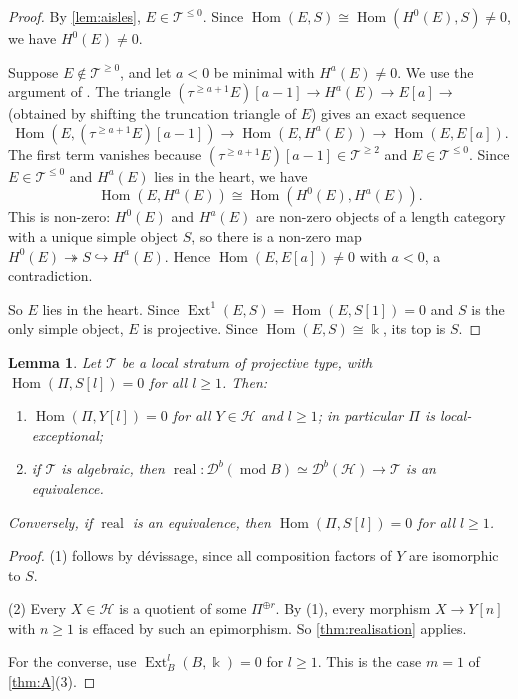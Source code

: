 \documentclass[11pt,reqno]{amsart}
\theoremstyle{plain}
\newtheorem{lemma}[theorem]{Lemma}
\theoremstyle{definition}
\theoremstyle{remark}
\newcommand{\kk}{\Bbbk}
\DeclareMathOperator{\Hom}{Hom}
\DeclareMathOperator{\Ext}{Ext}
\DeclareMathOperator{\real}{real}
\newcommand{\modd}{\operatorname{mod}}
\newcommand{\Db}{\mathcal{D}^b}
\newcommand{\cH}{\mathcal{H}}
\newcommand{\cT}{\mathcal{T}}
\begin{document}
\begin{proof}
By \cref{lem:aisles}, $E\in\cT^{\le0}$. Since $\Hom(E,S)\cong\Hom(H^0(E),S)\neq0$, we have $H^0(E)\ne0$.

Suppose $E\notin\cT^{\ge0}$, and let $a<0$ be minimal with $H^a(E)\ne0$. We use the argument of \cite[Lemma~3.12]{Bonf26}. The triangle $(\tau^{\ge a+1}E)[a-1]\to H^a(E)\to E[a]\to$ (obtained by shifting the truncation triangle of $E$) gives an exact sequence
\[\Hom(E,(\tau^{\ge a+1}E)[a-1])\to\Hom(E,H^a(E))\to\Hom(E,E[a]).\]
The first term vanishes because $(\tau^{\ge a+1}E)[a-1]\in\cT^{\ge2}$ and $E\in\cT^{\le0}$. Since $E\in\cT^{\le0}$ and $H^a(E)$ lies in the heart, we have
\[\Hom(E,H^a(E))\cong\Hom(H^0(E),H^a(E)).\]
This is non-zero: $H^0(E)$ and $H^a(E)$ are non-zero objects of a length category with a unique simple object $S$, so there is a non-zero map $H^0(E)\twoheadrightarrow S\hookrightarrow H^a(E)$. Hence $\Hom(E,E[a])\ne0$ with $a<0$, a contradiction.

So $E$ lies in the heart. Since $\Ext^1(E,S)=\Hom(E,S[1])=0$ and $S$ is the only simple object, $E$ is projective. Since $\Hom(E,S)\cong\kk$, its top is $S$.
\end{proof}

\begin{lemma}\label{lem:local-stratum-derived}
Let $\cT$ be a local stratum of projective type, with $\Hom(\Pi,S[l])=0$ for all $l\ge1$. Then:
\begin{enumerate}
\item $\Hom(\Pi,Y[l])=0$ for all $Y\in\cH$ and $l\ge1$; in particular $\Pi$ is local-exceptional;
\item if $\cT$ is algebraic, then $\real\colon\Db(\modd B)\simeq\Db(\cH)\to\cT$ is an equivalence.
\end{enumerate}
Conversely, if $\real$ is an equivalence, then $\Hom(\Pi,S[l])=0$ for all $l\ge1$.
\end{lemma}

\begin{proof}
(1) follows by d\'evissage, since all composition factors of $Y$ are isomorphic to $S$. 

(2) Every $X\in\cH$ is a quotient of some $\Pi^{\oplus r}$. By (1), every morphism $X\to Y[n]$ with $n\ge1$ is effaced by such an epimorphism. So \cref{thm:realisation} applies.

For the converse, use $\Ext^l_B(B,\kk)=0$ for $l\geq1$. This is the case $m=1$ of \cref{thm:A}(3).
\end{proof}
\end{document}
